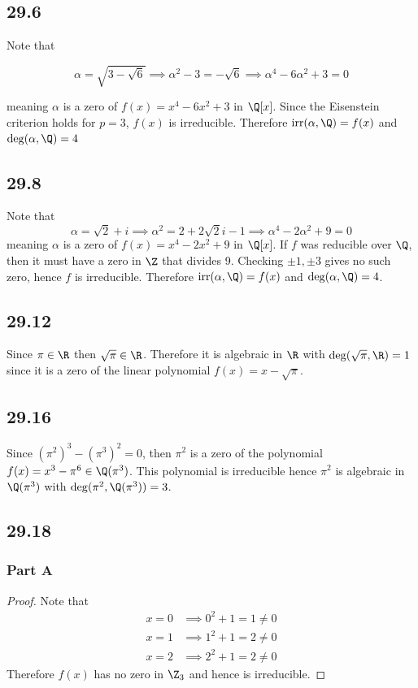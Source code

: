 \documentclass[12pt,titlepage]{extarticle}
\DeclareMathOperator{\irr}{irr}
\begin{document}
\subsection*{29.6}

Note that

\[
    \alpha = \sqrt{3 - \sqrt{6}} \implies \alpha^2 - 3 = - \sqrt{6} \implies \alpha^4 - 6 \alpha^2 + 3 = 0
\]

meaning $\alpha$ is a zero of $f(x) = x^4 - 6x^2 + 3$ in $\Q[x]$. Since the Eisenstein criterion holds for $p = 3$, $f(x)$ is irreducible. Therefore $\irr(\alpha, \Q) = f(x)$ and $\deg(\alpha, \Q) = 4$

\subsection*{29.8}
Note that
\[
    \alpha = \sqrt{2} + i \implies \alpha^2 = 2 + 2 \sqrt{2} i - 1 \implies \alpha^4 - 2 \alpha^2 + 9 = 0
\]
meaning $\alpha$ is a zero of $f(x) = x^4 - 2x^2 + 9$ in $\Q[x]$. If $f$ was reducible over $\Q$, then it must have a zero in $\Z$ that divides 9. Checking $\pm 1, \pm 3$ gives no such zero, hence $f$ is irreducible. Therefore $\irr(\alpha, \Q) = f(x)$ and $\deg(\alpha, \Q) = 4$.

\subsection*{29.12}
Since $\pi \in \R$ then $\sqrt{\pi} \in \R$. Therefore it is algebraic in $\R$ with $\deg(\sqrt{\pi}, \R) = 1$ since it is a zero of the linear polynomial $f(x) = x - \sqrt{\pi}$.

\subsection*{29.16}
Since $(\pi^2)^3 - (\pi^3)^2 = 0$, then $\pi^2$ is a zero of the polynomial $f(x) = x^3 - \pi^6 \in \Q(\pi^3)$. This polynomial is irreducible hence $\pi^2$ is algebraic in $\Q(\pi^3)$ with $\deg(\pi^2, \Q(\pi^3)) = 3$.

\subsection*{29.18}
\subsubsection*{Part A}
\begin{proof}
    Note that
    \begin{align*}
        x = 0 &\implies 0^2 + 1 = 1 \neq 0 \\
        x = 1 &\implies 1^2 + 1 = 2 \neq 0 \\
        x = 2 &\implies 2^2 + 1 = 2 \neq 0
    \end{align*}
    Therefore $f(x)$ has no zero in $\Z_3$ and hence is irreducible.
\end{proof}
\end{document}
